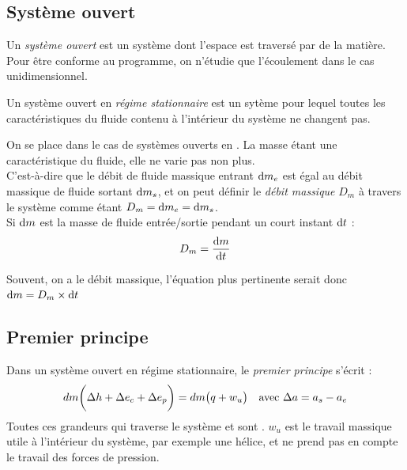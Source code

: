 \documentclass[11pt,a4paper,fleqn,pdftex]{report}
\begin{document}
\subsection{Système ouvert} %
\label{sub:systeme_ouvert}
\begin{dfn}
   Un \emph{système ouvert} est un système dont l'espace est traversé par de la matière. \\
   Pour être conforme au programme, on n'étudie que l'écoulement dans le cas unidimensionnel.
\end{dfn}
\begin{dfn}
   Un système ouvert en \emph{régime stationnaire} est un sytème pour lequel toutes les caractéristiques du fluide contenu à l'intérieur du système ne changent pas.
\end{dfn}
\begin{dfn}
   On se place dans le cas de systèmes ouverts en . La masse étant une caractéristique du fluide, elle ne varie pas non plus. \\
   C'est-à-dire que le débit de fluide massique entrant $\mathrm{d} m_e$ est égal au débit massique de fluide sortant $\mathrm{d} m_s$, et on peut définir le \emph{débit massique} $D_m$ à travers le système comme étant $D_m =\mathrm{d} m_e = \mathrm{d} m_s$.\\
   Si $\mathrm{d} m$ est la masse de fluide entrée/sortie pendant un court instant $\mathrm{d} t$ : 
   \begin{equation}
   D_m = \dfrac{\mathrm{d} m}{\mathrm{d} t}
   \end{equation}
\end{dfn}
Souvent, on a le débit massique, l'équation plus pertinente serait donc $\mathrm{d} m = D_m\times \mathrm{d} t$
\subsection{Premier principe}
\begin{itheorem}
   Dans un système ouvert en régime stationnaire, le \emph{premier principe} s'écrit : 
   \begin{equation}
   dm \bigg( \Delta h + \Delta e_c +\Delta e_p \bigg) = dm \big( q + w_u \big)\\ \quad\text{avec }\Delta a = a_s - a_e
   \end{equation}
   Toutes ces grandeurs  qui traverse le système et sont . $w_u$ est le travail massique utile à l'intérieur du système, par exemple une hélice, et ne prend pas en compte le travail des forces de pression.\\ %
\end{itheorem}
\end{document}
